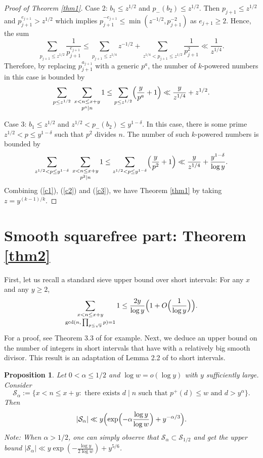 \documentclass[12pt]{article}
\newtheorem{proposition}{Proposition}
\begin{document}
\begin{proof}[Proof of Theorem \ref{thm1}]
\bigskip

Case 2: $b_1 \le z^{1/2}$ and $p_{-}(b_2) \le z^{1/2}$. Then $p_{j+1} \le z^{1/2}$ and $p_{j+1}^{e_{j+1}} > z^{1/2}$ which implies $p_{j+1}^{-e_{j+1}} \le \min(z^{-1/2}, p_{j+1}^{-2})$ as $e_{j+1} \ge 2$. Hence, the sum
\[
\sum_{p_{j+1} \le z^{1/2}} \frac{1}{p_{j+1}^{e_{j+1}}} \le \sum_{p_{j+1} \le z^{1/4}} z^{-1/2} + \sum_{z^{1/4} < p_{j+1} \le z^{1/2}} \frac{1}{p_{j+1}^2} \ll \frac{1}{z^{1/4}}.
\]
Therefore, by replacing $p_{j+1}^{a_{j+1}}$ with a generic $p^a$, the number of $k$-powered numbers in this case is bounded by 
\begin{equation} \label{c2}
\sum_{p \le z^{1/2}} \; \mathop{\sum_{x < n \le x + y}}_{p^a \mid n} 1 \le \sum_{p \le z^{1/2}} \Bigl( \frac{y}{p^a} + 1 \Bigr) \ll \frac{y}{z^{1/4}} + z^{1/2}.
\end{equation}

Case 3: $b_1 \le z^{1/2}$ and $z^{1/2} < p_{-}(b_2) \le y^{1 - \delta}$. In this case, there is some prime $z^{1/2} < p \le y^{1 - \delta}$ such that $p^2$ divides $n$. The number of such $k$-powered numbers is bounded by
\begin{equation} \label{c3}
\sum_{z^{1/2} < p \le y^{1 - \delta}} \; \mathop{\sum_{x < n \le x + y}}_{p^2 \mid n} 1 \le \sum_{z^{1/2} < p \le y^{1 - \delta}} \Bigl( \frac{y}{p^2} + 1 \Bigr) \ll \frac{y}{z^{1/4}} + \frac{y^{1 - \delta}}{\log y}.
\end{equation}
Combining (\ref{c1}), (\ref{c2}) and (\ref{c3}), we have Theorem \ref{thm1} by taking $z = y^{(k-1) / k}$.
\end{proof}




\section{Smooth squarefree part: Theorem \ref{thm2}}

First, let us recall a standard sieve upper bound over short intervals: For any $x$ and any $y \ge 2$,
\begin{equation} \label{sievebd}
\mathop{\sum_{x < n \le x + y}}_{\gcd(n, \, \prod_{p \le \sqrt{y}} p ) = 1} 1 \le \frac{2y}{\log y} \Bigl(1 + O \Bigl( \frac{1}{\log y} \Bigr) \Bigr).
\end{equation}
For a proof, see Theorem 3.3 of \cite{MV:2007} for example. Next, we deduce an upper bound on the number of integers in short intervals that have with a relatively big smooth divisor. This result is an adaptation of Lemma 2.2 of \cite{BKS:2021} to short intervals.
\begin{proposition} \label{P}
Let $0 < \alpha \le 1/2$ and $\log w = o(\log y)$ with $y$ sufficiently large. Consider
\[
\mathcal{S}_\alpha := \{ x < n \le x + y : \text{ there exists $d \mid n$ such that } p^+(d) \le w \text{ and } d > y^\alpha \}.
\]
Then
\[
| \mathcal{S}_\alpha | \ll y \Bigl( \exp \Bigl(- \alpha \frac{\log y}{\log w} \Bigr) + y^{-\alpha / 3} \Bigr).
\]
Note: When $\alpha > 1/2$, one can simply observe that $\mathcal{S}_\alpha \subset \mathcal{S}_{1/2}$ and get the upper bound $|\mathcal{S}_\alpha| \ll y \exp( -\frac{ \log y}{2 \log w} ) + y^{5/6}$.
\end{proposition}
\end{document}
